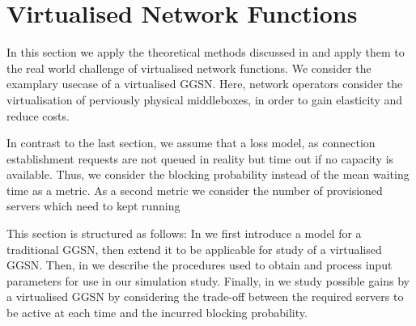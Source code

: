 \section{Virtualised Network Functions}\label{sec:cloud:virtualized_network_functions}

\newcommand{\blockingprobability}[0]{p_B}

\cite{Metzger2014a}
In this section we apply the theoretical methods discussed in  and apply them to the real world challenge of virtualised network functions.
We consider the examplary usecase of a virtualised \gls{GGSN}.
Here, network operators consider the virtualisation of perviously physical middleboxes, in order to gain elasticity and reduce costs.

In contrast to the last section, we assume that a loss model, as connection establishment requests are not queued in reality but time out if no capacity is available.
Thus, we consider the blocking probability instead of the mean waiting time as a metric.
As a second metric we consider the number of provisioned servers which need to kept running 

This section is structured as follows:
In  we first introduce a model for a traditional \gls{GGSN}, then extend it to be applicable for study of a virtualised \gls{GGSN}.
Then, in  we describe the procedures used to obtain and process input parameters for use in our simulation study.
Finally, in  we study possible gains by a virtualised \gls{GGSN} by considering the trade-off between the required servers to be active at each time and the incurred blocking probability. 




